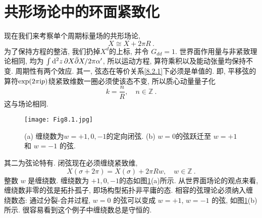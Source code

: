 \section{共形场论中的环面紧致化} \label{sec:8.2}%

现在我们来考察单个周期标量场的共形场论,
\begin{equation}
	X \cong X+2 \pi R \:. \label{8.2.1}
\end{equation}
为了保持方程的整洁, 我们扔掉$X^{d}$的上标, 并令 $G_{d d}=1$. 世界面作用量与非紧致理论相同, 均为 $\int \mathrm{d}^{2} z \,\partial X \bar{\partial} X / 2 \pi \alpha^{\prime}$, 所以运动方程, 算符乘积以及能动张量均保持不变. 周期性有两个效应. 其一, 弦态在等价关系\eqref{8.2.1}下必须是单值的. 
即, 平移弦的算符$\exp(2\pi\mathrm{i} p)$绕紧致维数一圈必须使该态不变, 所以质心动量量子化
\begin{equation}
	k=\frac{n}{R}, \quad n \in \mathds{Z} \:. \label{8.2.2}
\end{equation}
这与场论相同.


\begin{figure}[h]
	\begin{center}
		\texttt{[image: Fig8.1.jpg]}\\
		\caption{(a) 缠绕数为$w=+1,0,-1$的定向闭弦. (b) $w=0$的弦跃迁至 $w=+1$ 和 $w=-1$ 的弦.}\label{Fig8.1}
	\end{center}
\end{figure}


其二为弦论特有. 闭弦现在必须缠绕紧致维,
\begin{equation}
	X(\sigma+2 \pi)=X(\sigma)+2 \pi R w, \quad w \in \mathds{Z} \:. \label{8.2.3}
\end{equation}
整数 $w$ 是缠绕数. 缠绕数为 $+1, 0 ,-1$的态如图\ref{Fig8.1}(a)所示.
从世界面场论的观点来看, 缠绕数非零的弦是拓扑孤子, 即场构型拓扑非平庸的态. 相容的弦理论必须纳入缠绕数态: 通过分裂-合并过程, 
$w=0$ 的弦可以变成 $w=+1$, $w=-1$ 的弦, 如图\ref{Fig8.1}(b)所示. 很容易看到这个例子中缠绕数总是守恒的. 

